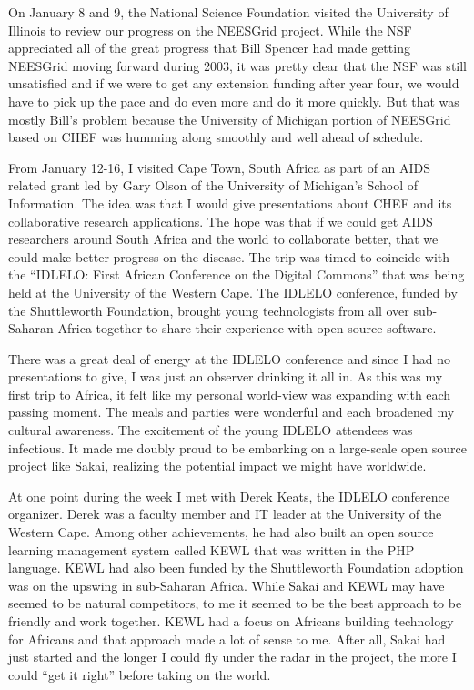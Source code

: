 \documentclass[12pt]{book}
\begin{document}
On January 8 and 9, the National Science Foundation visited the University
of Illinois to review our progress
on the NEESGrid project.   While the NSF appreciated all of the
great progress that Bill Spencer had made getting NEESGrid moving
forward during 2003, it was pretty clear that the NSF was still
unsatisfied and if we were to get any extension funding after year four, we would have
to pick up the pace and do even more and do it more quickly.  But that was mostly
Bill's problem because the University of Michigan portion of NEESGrid based
on CHEF was humming along smoothly and well ahead of schedule.

From January 12-16, I visited Cape Town, South Africa as part of an AIDS related
grant led by Gary Olson of the University of Michigan's School of Information.
The idea was that I would give presentations about CHEF and its collaborative research
applications.  The hope was that if we could get AIDS researchers around South Africa
and the world to
collaborate better, that we could make better progress on the disease.  The trip was
timed to coincide with the ``IDLELO: First African Conference on the Digital Commons''
that was being held at the University of the Western Cape.  The IDLELO
conference, funded by the Shuttleworth Foundation, brought young technologists
from all over sub-Saharan Africa together to share their experience with open source
software.

There was a great deal of energy at the IDLELO conference and since
I had no presentations to give, I was just an observer drinking it all in.
As this was my first trip to Africa, it felt like my personal world-view
was expanding with each passing moment.  The meals and parties were wonderful
and each broadened my cultural awareness.  The excitement of the young IDLELO attendees
was infectious.  It made me doubly proud to be embarking on a large-scale open source
project like Sakai, realizing the potential impact we might have worldwide.

At one point during the week I met with Derek Keats, the
IDLELO conference organizer.  Derek was
a faculty member and IT leader at the University of the Western Cape.  Among other
achievements, he had also built an open source learning management system called KEWL
that was written in the PHP language.  KEWL had also been funded by the Shuttleworth
Foundation adoption was on the upswing in sub-Saharan Africa.
While Sakai and KEWL may have seemed to be natural competitors, to me it seemed to be
the best approach to be friendly and work together.  KEWL had a focus on Africans
building technology for Africans and that approach made a lot of sense to me.
After all, Sakai had just started and the longer I could fly under the radar
in the project, the more I could ``get it right'' before taking on the world.
\end{document}
